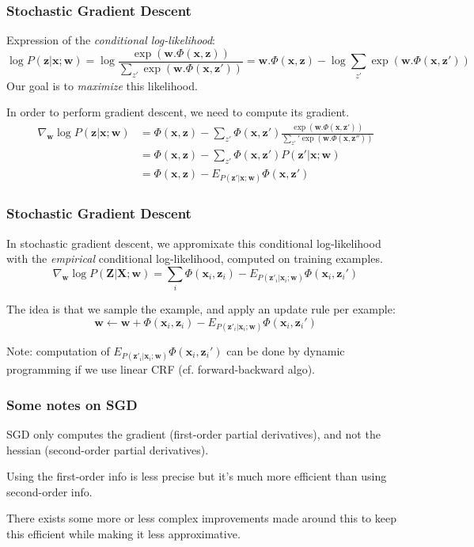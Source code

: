 \documentclass[usenames,dvipsnames]{beamer}
\newcommand{\x}{\mathbf{x}}
\newcommand{\w}{\mathbf{w}}
\newcommand{\z}{\mathbf{z}}
\newcommand{\X}{\mathbf{X}}
\newcommand{\Z}{\mathbf{Z}}
\newcommand{\voc}[1]{\emph{\color{ForestGreen}#1}}
\begin{document}
\begin{frame}\frametitle{Stochastic Gradient Descent}

Expression of the \voc{conditional log-likelihood}:
\begin{equation*}
  \log P(\z|\x;\w) = \log \frac{\exp(\w . \Phi(\x,\z))}{\sum_{z'}
    \exp(\w. \Phi(\x,\z'))} = \w . \Phi(\x,\z)- \log \sum_{z'} \exp(\w . \Phi(\x,\z'))
\end{equation*}
Our goal is to \emph{maximize} this likelihood.

\vspace{0.4cm}
In order to perform gradient descent, we need to compute its gradient.
\begin{align*}
\nabla_\w \log P(\z|\x;\w) &= \Phi(\x,\z)- \sum_{z'} \Phi(\x,\z') \frac{\exp(\w
  . \Phi(\x,\z'))}{\sum_{z'}' \exp(\w. \Phi(\x,\z''))} \\
                                          &= \Phi(\x,\z)- \sum_{z'}
                                          \Phi(\x,\z') P(\z'|\x;\w) \\
                                          &= \Phi(\x,\z)- E_{P(\z'|\x;\w)} \Phi(\x,\z')
\end{align*}
\end{frame}


\begin{frame}\frametitle{Stochastic Gradient Descent}
In stochastic gradient descent, we appromixate this conditional
log-likelihood with the \voc{empirical} conditional
log-likelihood, computed on training examples.
\begin{equation*}
\nabla_\w \log P(\Z|\X;\w) = \sum_i \Phi(\x_i,\z_i)- E_{P(\z'_i|\x_i;\w)} \Phi(\x_i,\z_i')
\end{equation*}

\vspace{0.4cm}
The idea is that we sample the example, and apply an update rule per example:
\begin{equation*}
 \w \leftarrow \w + \Phi(\x_i,\z_i)- E_{P(\z'_i|\x_i;\w)} \Phi(\x_i,\z_i')
\end{equation*}

\vspace{0.4cm}
Note: computation of $E_{P(\z'_i|\x_i;\w)} \Phi(\x_i,\z_i')$ can be done by
dynamic programming if we use linear CRF (cf. forward-backward algo).
\end{frame}

\begin{frame}\frametitle{Some notes on SGD}
SGD only computes the gradient (first-order partial derivatives), and not the hessian
(second-order partial derivatives).

\vspace{0.4cm}
Using the first-order info is less precise but it's much more efficient than using
second-order info.

\vspace{0.4cm}
There exists some more or less complex improvements made around this
to keep this efficient while making it less approximative.
\end{frame}
\end{document}

